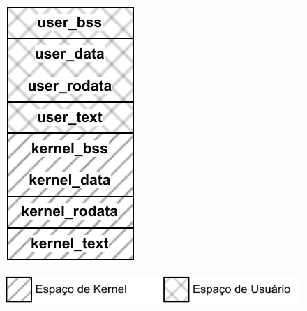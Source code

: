 \begin{figure}[tb]
                   {\includegraphics[width=\textwidth]{content/images/binary-structure-modified.pdf}}

	\includegraphics[width=.5\linewidth]{content/images/binary-structure-subtitle.pdf}
	
\end{figure}

